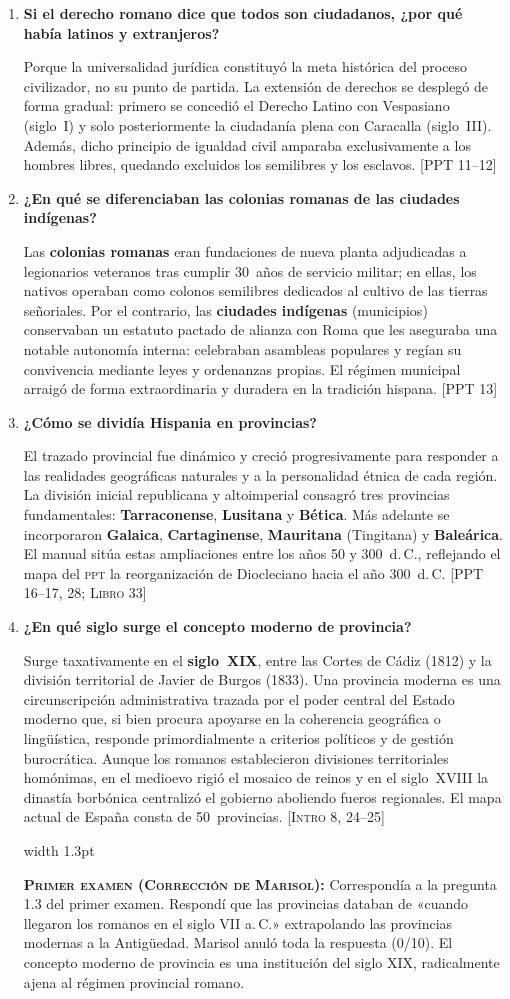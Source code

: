 \documentclass[11pt,letterpaper]{article}
\newcommand{\fuente}[1]{\nolinebreak\hfill{\footnotesize\color{black!55}\textsc{[#1]}}}
\newcommand{\examen}[1]{%
  \par\vspace{0.35em}%
  \noindent\hspace*{0.8em}%
  {\color{goodingCrimson}\vrule width 1.3pt}\hspace{0.7em}%
  \parbox{\dimexpr\linewidth-2.2em}{%
    \footnotesize\color{goodingCrimson}%
    \textbf{\textsc{Primer examen (Corrección de Marisol):}} #1%
  }%
  \par\vspace{0.35em}%
}
\newcommand{\preg}[1]{\item \textbf{#1}\par\nopagebreak\vspace{0.2em}}
\begin{document}
\begin{enumerate}[resume]
  \preg{Si el derecho romano dice que todos son ciudadanos, ¿por qué había latinos y extranjeros?}
  Porque la universalidad jurídica constituyó la meta histórica del proceso civilizador, no su punto de partida. La extensión de derechos se desplegó de forma gradual: primero se concedió el Derecho Latino con Vespasiano (siglo~I) y solo posteriormente la ciudadanía plena con Caracalla (siglo~III). Además, dicho principio de igualdad civil amparaba exclusivamente a los hombres libres, quedando excluidos los semilibres y los esclavos. \fuente{PPT 11--12}

  \preg{¿En qué se diferenciaban las colonias romanas de las ciudades indígenas?}
  Las \textbf{colonias romanas} eran fundaciones de nueva planta adjudicadas a legionarios veteranos tras cumplir 30~años de servicio militar; en ellas, los nativos operaban como colonos semilibres dedicados al cultivo de las tierras señoriales. Por el contrario, las \textbf{ciudades indígenas} (municipios) conservaban un estatuto pactado de alianza con Roma que les aseguraba una notable autonomía interna: celebraban asambleas populares y regían su convivencia mediante leyes y ordenanzas propias. El régimen municipal arraigó de forma extraordinaria y duradera en la tradición hispana. \fuente{PPT 13}

  \preg{¿Cómo se dividía Hispania en provincias?}
  El trazado provincial fue dinámico y creció progresivamente para responder a las realidades geográficas naturales y a la personalidad étnica de cada región. La división inicial republicana y altoimperial consagró tres provincias fundamentales: \textbf{Tarraconense}, \textbf{Lusitana} y \textbf{Bética}. Más adelante se incorporaron \textbf{Galaica}, \textbf{Cartaginense}, \textbf{Mauritana} (Tingitana) y \textbf{Baleárica}. El manual sitúa estas ampliaciones entre los años 50 y 300~d.\,C., reflejando el mapa del \textsc{ppt} la reorganización de Diocleciano hacia el año 300~d.\,C. \fuente{PPT 16--17, 28; Libro 33}

  \preg{¿En qué siglo surge el concepto moderno de provincia?}
  Surge taxativamente en el \textbf{siglo~XIX}, entre las Cortes de Cádiz (1812) y la división territorial de Javier de Burgos (1833). Una provincia moderna es una circunscripción administrativa trazada por el poder central del Estado moderno que, si bien procura apoyarse en la coherencia geográfica o lingüística, responde primordialmente a criterios políticos y de gestión burocrática. Aunque los romanos establecieron divisiones territoriales homónimas, en el medioevo rigió el mosaico de reinos y en el siglo~XVIII la dinastía borbónica centralizó el gobierno aboliendo fueros regionales. El mapa actual de España consta de 50~provincias. \fuente{Intro 8, 24--25}
  \examen{Correspondía a la pregunta 1.3 del primer examen. Respondí que las provincias databan de «cuando llegaron los romanos en el siglo VII a.\,C.» extrapolando las provincias modernas a la Antigüedad. Marisol anuló toda la respuesta (0/10). El concepto moderno de provincia es una institución del siglo XIX, radicalmente ajena al régimen provincial romano.}
\end{enumerate}
\end{document}
